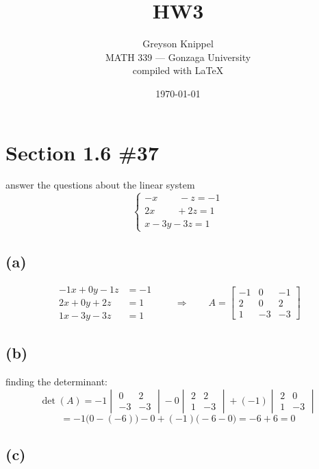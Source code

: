 \documentclass[12pt]{article}
\title{HW3}
\author{
Greyson Knippel \\[4pt]
MATH 339 --- Gonzaga University \\[4pt]
compiled with \LaTeX{}
}
\date{\today}
\begin{document}
\maketitle

\section*{Section 1.6 \#37}

answer the questions about the linear system
\[
\begin{cases}
-x \phantom{{}-3y} - z = -1 \\
2x \phantom{{}-3y} + 2z = 1 \\
x - 3y - 3z = 1
\end{cases}
\]

\subsection*{(a)}

\[
\begin{aligned}
-1x + 0y - 1z &= -1 \\
2x + 0y + 2z &= 1 \\
1x - 3y - 3z &= 1
\end{aligned}
\qquad\Longrightarrow\qquad
A = \begin{bmatrix} -1 & 0 & -1 \\ 2 & 0 & 2 \\ 1 & -3 & -3 \end{bmatrix}
\]

\subsection*{(b)}

finding the determinant:
\[
\det(A)
= -1\begin{vmatrix} 0 & 2 \\ -3 & -3 \end{vmatrix}
- 0\begin{vmatrix} 2 & 2 \\ 1 & -3 \end{vmatrix}
+ (-1)\begin{vmatrix} 2 & 0 \\ 1 & -3 \end{vmatrix}
\]
\[
= -1\bigl(0 - (-6)\bigr) - 0 + (-1)\bigl(-6 - 0\bigr)
= -6 + 6 = 0
\]

\subsection*{(c)}
\end{document}
